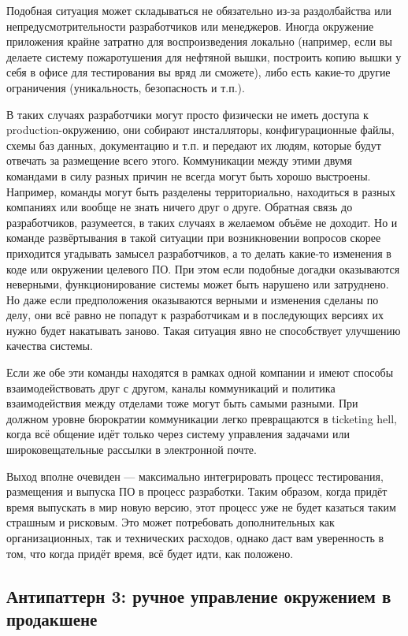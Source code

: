 \documentclass{../../text-style}
\begin{document}
Подобная ситуация может складываться не обязательно из-за раздолбайства или непредусмотрительности разработчиков или менеджеров. Иногда окружение приложения крайне затратно для воспроизведения локально (например, если вы делаете систему пожаротушения для нефтяной вышки, построить копию вышки у себя в офисе для тестирования вы вряд ли сможете), либо есть какие-то другие ограничения (уникальность, безопасность и т.п.).

В таких случаях разработчики могут просто физически не иметь доступа к production-окружению, они собирают инсталляторы, конфигурационные файлы, схемы баз данных, документацию и т.п. и передают их людям, которые будут отвечать за размещение всего этого. Коммуникации между этими двумя командами в силу разных причин не всегда могут быть хорошо выстроены. Например, команды могут быть разделены территориально, находиться в разных компаниях или вообще не знать ничего друг о друге. Обратная связь до разработчиков, разумеется, в таких случаях в желаемом объёме не доходит. Но и команде развёртывания в такой ситуации при возникновении вопросов скорее приходится угадывать замысел разработчиков, а то делать какие-то изменения в коде или окружении целевого ПО. При этом если подобные догадки оказываются неверными, функционирование системы может быть нарушено или затруднено. Но даже если предположения оказываются верными и изменения сделаны по делу, они всё равно не попадут к разработчикам и в последующих версиях их нужно будет накатывать заново. Такая ситуация явно не способствует улучшению качества системы.

Если же обе эти команды находятся в рамках одной компании и имеют способы взаимодействовать друг с другом, каналы коммуникаций и политика взаимодействия между отделами тоже могут быть самыми разными. При должном уровне бюрократии коммуникации легко превращаются в ticketing hell, когда всё общение идёт только через систему управления задачами или широковещательные рассылки в электронной почте.

Выход вполне очевиден --- максимально интегрировать процесс тестирования, размещения и выпуска ПО в процесс разработки. Таким образом, когда придёт время выпускать в мир новую версию, этот процесс уже не будет казаться таким страшным и рисковым. Это может потребовать дополнительных как организационных, так и технических расходов, однако даст вам уверенность в том, что когда придёт время, всё будет идти, как положено.

\subsection{Антипаттерн 3: ручное управление окружением в продакшене}
\end{document}
